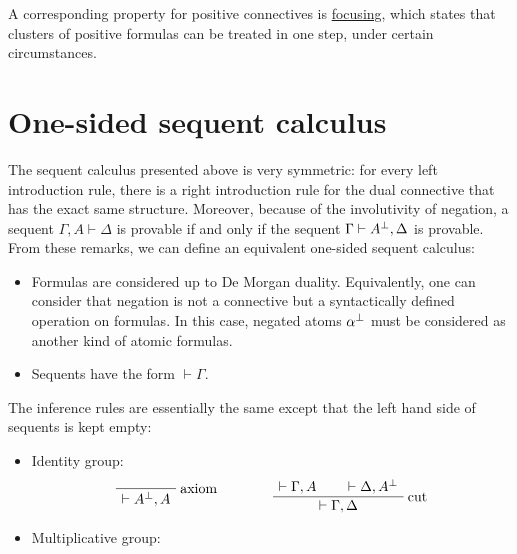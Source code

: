 A corresponding property for positive connectives is
\hyperref[reversibility-and-focusing]{focusing}, which states that
clusters of positive formulas can be treated in one step, under certain
circumstances.

\section{One-sided sequent calculus}\label{one-sided-sequent-calculus}

The sequent calculus presented above is very symmetric: for every left
introduction rule, there is a right introduction rule for the dual
connective that has the exact same structure. Moreover, because of the
involutivity of negation, a sequent \(\Gamma,A\vdash\Delta\) is provable
if and only if the sequent \(\Gamma\vdash A^\bot,\Delta\) is provable.
From these remarks, we can define an equivalent one-sided sequent
calculus:

\begin{itemize}
\tightlist
\item
  Formulas are considered up to De Morgan duality. Equivalently, one can
  consider that negation is not a connective but a syntactically defined
  operation on formulas. In this case, negated atoms \(\alpha^\bot\)
  must be considered as another kind of atomic formulas.
\item
  Sequents have the form \(\vdash\Gamma\).
\end{itemize}

The inference rules are essentially the same except that the left hand
side of sequents is kept empty:

\begin{itemize}
\tightlist
\item
  Identity group:
\begin{equation*}
  \LabelRule{\rulename{axiom}}
  \NulRule{ \vdash A\orth, A}
  \DisplayProof
  \qquad\qquad
  \AxRule{ \vdash \Gamma, A }
  \AxRule{ \vdash \Delta, A\orth }
  \LabelRule{\rulename{cut}}
  \BinRule{ \vdash \Gamma, \Delta }
  \DisplayProof
\end{equation*}

  \begin{description}
  \tightlist
  \item[]
  \end{description}
\end{itemize}


\begin{itemize}
\tightlist
\item
  Multiplicative group:

  \begin{description}
  \tightlist
  \item[]
  \end{description}
\end{itemize}

